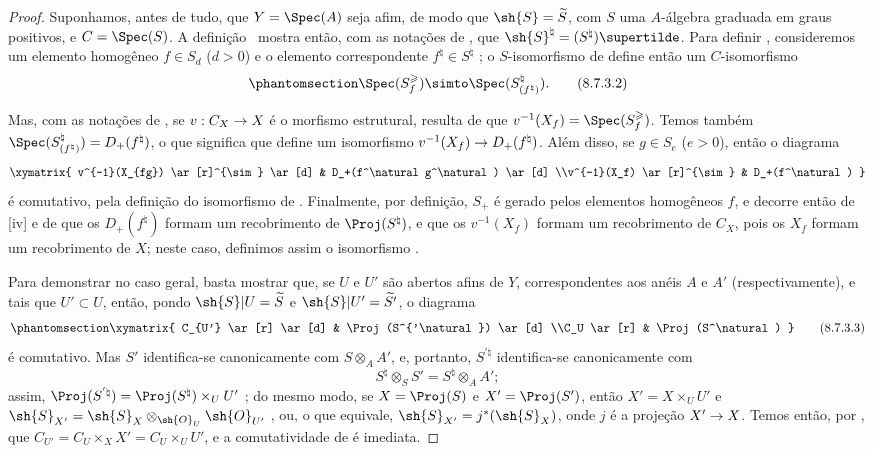 \documentclass[oneside,10pt]{amsart}
\makeatletter
\renewcommand{\geq}{\geqslant}
\newcommand{\ega@arrow}[2]{\mathchoice{#1}{#2}{#2}{#2}}
\renewcommand{\to}{\ega@arrow{\longrightarrow}{\rightarrow}}
\newcommand{\oldpage}[2][]{\marginnote{\normalfont\footnotesize\textbf{#1}~|~#2}\ignorespaces}
\let\EGAOriginalLabel\label
\renewcommand{\label}[1]{\phantomsection\EGAOriginalLabel{#1}}
\makeatother
\begin{document}
\begin{proof}
Suponhamos, antes de tudo, que $Y=\Spec(A)$ seja afim, de modo que $\sh{S}=\widetilde{S}$, com $S$ uma $A$-álgebra graduada em graus positivos, e $C=\Spec(S)$.
A definição~ mostra então, com as notações de , que $\sh{S}^\natural=(S^\natural)\supertilde$.
Para definir , consideremos um elemento homogêneo $f\in S_d$ ($d>0$) e o elemento correspondente $f^\natural\in S^\natural$ ;
o $S$-isomorfismo de  define então um $C$-isomorfismo
\[
\label{II.8.7.3.2}
  \Spec(S_f^\geq) \simto \Spec(S_{(f^\natural)}^\natural).
\tag{8.7.3.2}
\]

\oldpage[II]{175}
Mas, com as notações de , se $v:C_X\to X$ é o morfismo estrutural, resulta de  que $v^{-1}(X_f)=\Spec(S_f^\geq)$.
Temos também $\Spec(S_{(f^\natural)}^\natural)=D_+(f^\natural)$, o que significa que  define um isomorfismo $v^{-1}(X_f)\to D_+(f^\natural)$.
Além disso, se $g\in S_e$ ($e>0$), então o diagrama
\[
  \xymatrix{
    v^{-1}(X_{fg})
      \ar[r]^{\sim}
      \ar[d]
  & D_+(f^\natural g^\natural)
      \ar[d]
  \\v^{-1}(X_f)
      \ar[r]^{\sim}
  & D_+(f^\natural)
  }
\]
é comutativo, pela definição do isomorfismo de .
Finalmente, por definição, $S_+$ é gerado pelos elementos homogêneos $f$, e decorre então de [iv] e de  que os $D_+(f^\natural)$ formam um recobrimento de $\Proj(S^\natural)$, e que os $v^{-1}(X_f)$ formam um recobrimento de $C_X$, pois os $X_f$ formam um recobrimento de $X$;
neste caso, definimos assim o isomorfismo .

Para demonstrar  no caso geral, basta mostrar que, se $U$ e $U'$ são abertos afins de $Y$, correspondentes aos anéis $A$ e $A'$ (respectivamente), e tais que $U'\subset U$, então, pondo $\sh{S}|U=\widetilde{S}$ e $\sh{S}|U'=\widetilde{S'}$, o diagrama
\[
\label{II.8.7.3.3}
  \xymatrix{
    C_{U'}
      \ar[r]
      \ar[d]
  & \Proj(S^{'\natural})
      \ar[d]
  \\C_U
      \ar[r]
  & \Proj(S^\natural)
  }
\tag{8.7.3.3}
\]
é comutativo.
Mas $S'$ identifica-se canonicamente com $S\otimes_A A'$, e, portanto, $S^{'\natural}$ identifica-se canonicamente com
\[
  S^\natural \otimes_S S' = S^\natural \otimes_A A';
\]
assim, $\Proj(S^{'\natural}) = \Proj(S^\natural)\times_U U'$ ;
do mesmo modo, se $X=\Proj(S)$ e $X'=\Proj(S')$, então $X'=X\times_U U'$ e $\sh{S}_{X'}=\sh{S}_X\otimes_{\sh{O}_U}\sh{O}_{U'}$ , ou, o que equivale, $\sh{S}_{X'}=j^*(\sh{S}_X)$, onde $j$ é a projeção $X'\to X$.
Temos então, por , que $C_{U'} = C_U\times_X X' = C_U\times_U U'$, e a comutatividade de  é imediata.
\end{proof}
\end{document}
